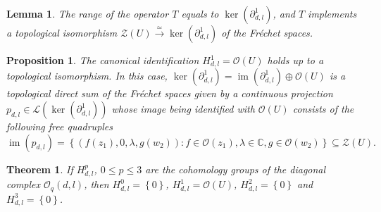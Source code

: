 \documentclass[10pt,a4paper]{amsart}
\newtheorem{lemma}{Lemma}
\newtheorem{proposition}{Proposition}
\newtheorem{theorem}{Theorem}
\begin{document}
\begin{lemma}
\label{lemTech4}The range of the operator $T$ equals to $\ker\left(
\partial_{d,l}^{1}\right)  $, and $T$ implements a topological isomorphism
$\mathcal{Z}\left(  U\right)  \overset{\simeq}{\longrightarrow}\ker\left(
\partial_{d,l}^{1}\right)  $ of the Fr\'{e}chet spaces.
\end{lemma}

\begin{proposition}
\label{propTechE}The canonical identification $H_{d,l}^{1}=\mathcal{O}\left(
U\right)  $ holds up to a topological isomorphism. In this case, $\ker\left(
\partial_{d,l}^{1}\right)  =\operatorname{im}\left(  \partial_{d,l}%
^{1}\right)  \oplus\mathcal{O}\left(  U\right)  $ is a topological direct sum
of the Fr\'{e}chet spaces given by a continuous projection $p_{d,l}%
\in\mathcal{L}\left(  \ker\left(  \partial_{d,l}^{1}\right)  \right)  $ whose
image being identified with $\mathcal{O}\left(  U\right)  $ consists of the
following free quadruples
\[
\operatorname{im}\left(  p_{d,l}\right)  =\left\{  \left(  f\left(
z_{1}\right)  ,0,\lambda,g\left(  w_{2}\right)  \right)  :f\in\mathcal{O}%
\left(  z_{1}\right)  ,\lambda\in\mathbb{C},g\in\mathcal{O}\left(
w_{2}\right)  \right\}  \subseteq\mathcal{Z}\left(  U\right)  .
\]

\end{proposition}

\begin{theorem}
\label{thMain1}If $H_{d,l}^{p}$, $0\leq p\leq3$ are the cohomology groups of
the diagonal complex $\mathcal{O}_{q}\left(  d,l\right)  $, then $H_{d,l}%
^{0}=\left\{  0\right\}  $, $H_{d,l}^{1}=\mathcal{O}\left(  U\right)  $,
$H_{d,l}^{2}=\left\{  0\right\}  $ and $H_{d,l}^{3}=\left\{  0\right\}  $.
\end{theorem}
\end{document}
